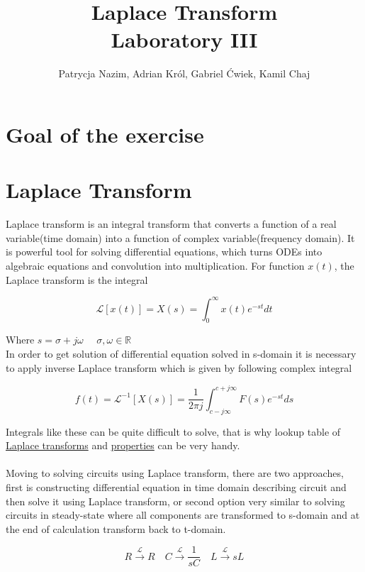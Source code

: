 \documentclass[notitlepage, a4paper, 11pt]{article}
\title{Laplace Transform\\
	\large Laboratory III}
\author{Patrycja Nazim, Adrian Król, Gabriel Ćwiek, Kamil Chaj}
\date{}
\begin{document}
	\maketitle
	\section{Goal of the exercise}
	\section{Laplace Transform}
	Laplace transform is an integral transform that converts a function of a real variable(time domain) into a function of complex variable(frequency domain). It is powerful tool for solving differential equations, which turns ODEs into algebraic equations and convolution into multiplication. For function $x(t)$, the Laplace transform is the integral
	
	\begin{equation}
		\mathcal{L}[x(t)] = X(s) = \int_{0}^{\infty}x(t)e^{-st}dt
	\end{equation}
	
	Where $s = \sigma+j\omega$ $\quad \sigma,\omega\in \mathbb{R}$
	\\
	In order to get solution of differential equation solved in s-domain it is necessary to apply inverse Laplace transform which is given by following complex integral
	
	\begin{equation}
		f(t) = \mathcal{L}^{-1}[X(s)] = \dfrac{1}{2\pi j}\int_{c-j\infty}^{c+j\infty}F(s)e^{-st}ds
	\end{equation}
	
	Integrals like these can be quite difficult to solve, that is why lookup table of \href{https://en.wikipedia.org/wiki/Laplace_transform#Table_of_selected_Laplace_transforms}{Laplace transforms} and \href{https://en.wikipedia.org/wiki/Laplace_transform#Properties_and_theorems}{properties} can be very handy.
	\\ \\
	Moving to solving circuits using Laplace transform, there are two approaches, first is constructing differential equation in time domain describing circuit and then solve it using Laplace transform, or second option very similar to solving circuits in steady-state where all components are transformed to s-domain and at the end of calculation transform back to t-domain.
	
	\begin{equation}\label{eq:laplace-rules}
		R \xrightarrow{\mathcal{L}} R \quad C \xrightarrow{\mathcal{L}} \frac{1}{sC} \quad L \xrightarrow{\mathcal{L}} sL
	\end{equation}
	
\end{document}
